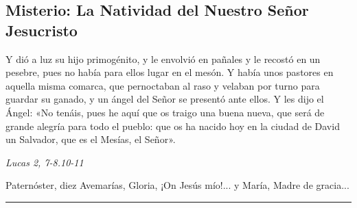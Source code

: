 \documentclass[./rosary.tex]{subfiles}
\newcounter{joyful-counter}
\begin{document}
\bigskip

\subsection*{ Misterio: La Natividad del Nuestro Señor Jesucristo}

Y dió a luz su hijo primogénito, y le envolvió en pañales y le recostó en un pesebre, pues no había para ellos lugar en el mesón.
Y había unos pastores en aquella misma comarca, que pernoctaban al raso y velaban por turno para guardar su ganado,
y un ángel del  Señor se presentó ante ellos. Y les dijo el Ángel: «No tenáis, pues he aquí que os traigo una buena nueva,
que será de grande alegría para todo el pueblo: que os ha nacido hoy en la ciudad de David un Salvador, que es el Mesías, el Señor».

\begin{flushright}
      \emph{Lucas 2, 7-8.10-11}
\end{flushright}

Paternóster, diez Avemarías, Gloria, ¡On Jesús mío!... y María, Madre de gracia...

\rule{\textwidth}{0.5pt}
\end{document}
